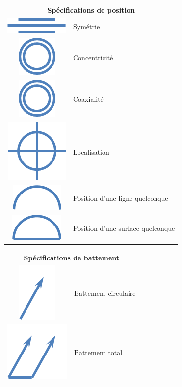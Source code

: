 \documentclass[11pt,oneside]{article}
\begin{document}
\begin{resultat}
\begin{center}
\begin{tabular}{cl}
\multicolumn{2}{c}{\textbf{Spécifications de position}}\\
\includegraphics[width=.5cm]{png/symetrie}
& Symétrie\\
\includegraphics[width=.5cm]{png/coaxialite}
& Concentricité\\
\includegraphics[width=.5cm]{png/coaxialite}
& Coaxialité \\
\includegraphics[width=.5cm]{png/localisation}
& Localisation \\
\includegraphics[width=.5cm]{png/ligne}
& Position d'une ligne quelconque\\
\includegraphics[width=.5cm]{png/surface}
& Position d'une surface quelconque\\
\end{tabular}
\begin{tabular}{cl}
\multicolumn{2}{c}{\textbf{Spécifications de battement}}\\
\includegraphics[width=.5cm]{png/battements}
& Battement circulaire \\
\includegraphics[width=.5cm]{png/battementt}
& Battement total\\
\end{tabular}
\end{center}

\end{resultat}
\end{document}
